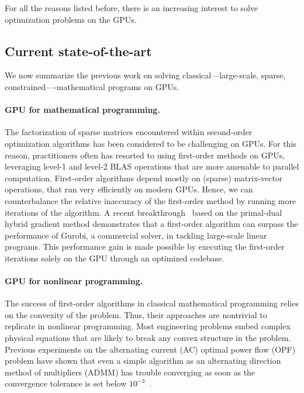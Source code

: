 For all the reasons listed before, there is an increasing interest to solve optimization problems on the GPUs.

\subsection{Current state-of-the-art}
We now summarize the previous work on solving classical---large-scale, sparse, constrained----mathematical programs on GPUs.

\paragraph{GPU for mathematical programming.}
The factorization of sparse matrices encountered within second-order optimization algorithms has been considered to be challenging  on GPUs.
For this reason, practitioners often has resorted to using first-order
methods on GPUs, leveraging level-1 and level-2 BLAS operations that
are more amenable to parallel computation.
First-order algorithms depend mostly on (sparse) matrix-vector operations, that run
very efficiently on modern GPUs. Hence, we can counterbalance
the relative inaccuracy of the first-order method by running more
iterations of the algorithm.
A recent breakthrough~\cite{lu2023cupdlp,lu2023cupdlp2} based on the primal-dual hybrid gradient method demonstrates
that a first-order algorithm can surpass the performance of Gurobi, a
commercial solver, in tackling large-scale linear programs. This
performance gain is made possible by executing the first-order
iterations solely on the GPU through an optimized codebase.


\paragraph{GPU for nonlinear programming.}
The success of first-order algorithms in classical mathematical programming
relies on the convexity of the problem. Thus, their approaches are nontrivial to replicate
in nonlinear programming. Most engineering problems embed complex
physical equations that are likely to break any convex structure in the problem.
Previous experiments on the alternating current (AC) optimal power flow (OPF) problem have shown that even a simple
algorithm as an alternating direction method of multipliers (ADMM) has trouble converging as soon as the convergence
tolerance is set below $10^{-3}$~\cite{kim2021leveraging}.

